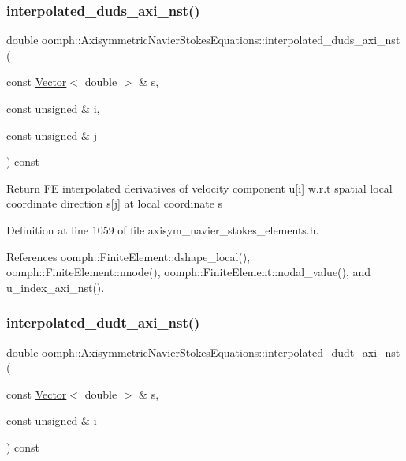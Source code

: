 \subsubsection{\texorpdfstring{interpolated\+\_\+duds\+\_\+axi\+\_\+nst()}{interpolated\_duds\_axi\_nst()}}
{\footnotesize\ttfamily double oomph\+::\+Axisymmetric\+Navier\+Stokes\+Equations\+::interpolated\+\_\+duds\+\_\+axi\+\_\+nst (\begin{DoxyParamCaption}\item[{const \hyperlink{classoomph_1_1Vector}{Vector}$<$ double $>$ \&}]{s,  }\item[{const unsigned \&}]{i,  }\item[{const unsigned \&}]{j }\end{DoxyParamCaption}) const\hspace{0.3cm}{\ttfamily [inline]}}

Return FE interpolated derivatives of velocity component u\mbox{[}i\mbox{]} w.\+r.\+t spatial local coordinate direction s\mbox{[}j\mbox{]} at local coordinate s 

Definition at line 1059 of file axisym\+\_\+navier\+\_\+stokes\+\_\+elements.\+h.



References oomph\+::\+Finite\+Element\+::dshape\+\_\+local(), oomph\+::\+Finite\+Element\+::nnode(), oomph\+::\+Finite\+Element\+::nodal\+\_\+value(), and u\+\_\+index\+\_\+axi\+\_\+nst().

\mbox{\label{classoomph_1_1AxisymmetricNavierStokesEquations_a9273991703fe6e7fb0fa48d61135426d}} 
\subsubsection{\texorpdfstring{interpolated\+\_\+dudt\+\_\+axi\+\_\+nst()}{interpolated\_dudt\_axi\_nst()}}
{\footnotesize\ttfamily double oomph\+::\+Axisymmetric\+Navier\+Stokes\+Equations\+::interpolated\+\_\+dudt\+\_\+axi\+\_\+nst (\begin{DoxyParamCaption}\item[{const \hyperlink{classoomph_1_1Vector}{Vector}$<$ double $>$ \&}]{s,  }\item[{const unsigned \&}]{i }\end{DoxyParamCaption}) const\hspace{0.3cm}{\ttfamily [inline]}}

